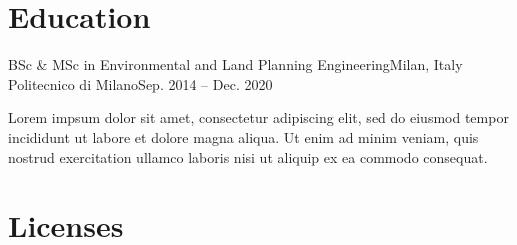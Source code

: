 \documentclass[letterpaper,11pt]{article}
\begin{document}


\section{Education}
\begin{sectionElementsList}
  \experienceElement
  {BSc \& MSc in Environmental and Land Planning Engineering}{Milan, Italy}
  {Politecnico di Milano}{Sep. 2014 -- Dec. 2020}
  {Lorem impsum dolor sit amet, consectetur adipiscing elit, sed do eiusmod tempor incididunt ut labore et dolore magna aliqua. Ut enim ad minim veniam, quis nostrud exercitation ullamco laboris nisi ut aliquip ex ea commodo consequat.
      
  }{}

\end{sectionElementsList}

\section{Licenses}
\begin{sectionElementsList}
\end{sectionElementsList}
\end{document}
